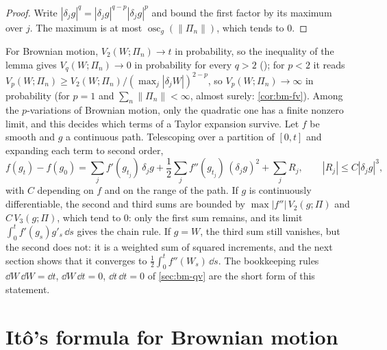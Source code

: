 \begin{proof}
Write $|\delta_jg|^q=|\delta_jg|^{q-p}|\delta_jg|^p$ and bound the first factor by its maximum
over $j$. The maximum is at most $\operatorname{osc}_g(\|\Pi_n\|)$, which tends to $0$.
\end{proof}

For Brownian motion, $V_2(W;\Pi_n)\to t$ in probability, so the inequality of the lemma gives
$V_q(W;\Pi_n)\to0$ in probability for every $q>2$ (); for $p<2$ it reads
$V_p(W;\Pi_n)\ge V_2(W;\Pi_n)/(\max_j|\delta_jW|)^{2-p}$, so $V_p(W;\Pi_n)\to\infty$ in probability
(for $p=1$ and $\sum_n\|\Pi_n\|<\infty$, almost surely: \cref{cor:bm-fv}).
Among the $p$-variations of Brownian motion, only the quadratic one has a finite nonzero limit,
and this decides which terms of a Taylor expansion survive. Let $f$ be smooth and $g$ a continuous path.
Telescoping over a partition of $[0,t]$ and expanding each term to second order,
\begin{equation}\label{eq:itf-taylor}
  f(g_t)-f(g_0)=\sum_jf'(g_{t_j})\,\delta_jg+\frac12\sum_jf''(g_{t_j})\,(\delta_jg)^2
  +\sum_jR_j,\qquad|R_j|\le C|\delta_jg|^3,
\end{equation}
with $C$ depending on $f$ and on the range of the path. If $g$ is continuously differentiable, the second and third sums are bounded by
$\max|f''|\,V_2(g;\Pi)$ and $C\,V_3(g;\Pi)$, which tend to $0$: only the first sum remains, and its
limit $\int_0^tf'(g_s)g'_s\,\dd s$ gives the chain rule. If $g=W$, the third sum still vanishes,
but the second does not: it is a weighted sum of squared increments, and the next section shows
that it converges to $\frac12\int_0^tf''(W_s)\,\dd s$. The bookkeeping rules
$\dd W\,\dd W=\dd t$, $\dd W\,\dd t=0$, $\dd t\,\dd t=0$ of \cref{sec:bm-qv} are the short form of
this statement.

\section{It\^o's formula for Brownian motion}\label{sec:itf-bm}

